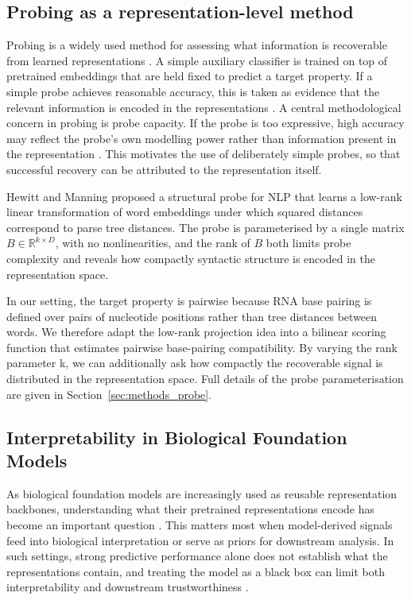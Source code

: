 \documentclass[logo,bsc,singlespacing,parskip]{infthesis}
\begin{document}
\subsection{Probing as a representation-level method}
\label{sec:bg_probing_nlp}
Probing is a widely used method for assessing what information is recoverable from learned representations \citep{conneau2018probing,hewitt2019structural}. 
A simple auxiliary classifier is trained on top of pretrained embeddings that are held fixed to predict a target property. If a simple probe achieves reasonable accuracy, this is taken as evidence that the relevant information is encoded in the representations \citep{hewitt2019designing,belinkov2022probing}.
A central methodological concern in probing is probe capacity. If the probe is too expressive, high accuracy may reflect the probe's own modelling power rather than information present in the representation \citep{hewitt2019designing}. This motivates the use of deliberately simple probes, so that successful recovery can be attributed to the representation itself.

Hewitt and Manning \citep{hewitt2019structural} proposed a structural probe for NLP that learns a low-rank linear transformation of word embeddings under which squared distances correspond to parse tree distances. The probe is parameterised by a single matrix $B \in \mathbb{R}^{k \times D}$, with no nonlinearities, and the rank of $B$ both limits probe complexity and reveals how compactly syntactic structure is encoded in the representation space.

In our setting, the target property is pairwise because RNA base pairing is defined over pairs of nucleotide positions rather than tree distances between words. We therefore adapt the low-rank projection idea into a bilinear scoring function that estimates pairwise base-pairing compatibility. 
By varying the rank parameter k, we can additionally ask how compactly the recoverable signal is distributed in the representation space. Full details of the probe parameterisation are given in Section~\ref{sec:methods_probe}.

\subsection{Interpretability in Biological Foundation Models}
\label{sec:bg_interp_protein}

As biological foundation models are increasingly used as reusable
representation backbones, understanding what their pretrained
representations encode has become an important question
\citep{guo2025foundation,budhkar2025demystifying}. 
This matters most when model-derived signals feed into biological interpretation or serve as priors for downstream analysis.
In such settings, strong predictive performance alone does not establish
what the representations contain, and treating the model as a black box
can limit both interpretability and downstream trustworthiness
\citep{budhkar2025demystifying,zhou2025pathway}.
\end{document}

